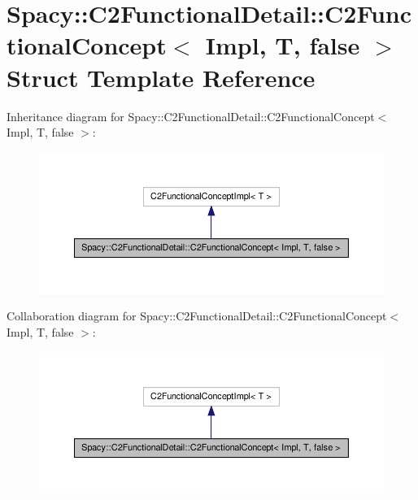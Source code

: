 \hypertarget{structSpacy_1_1C2FunctionalDetail_1_1C2FunctionalConcept_3_01Impl_00_01T_00_01false_01_4}{\section{\-Spacy\-:\-:\-C2\-Functional\-Detail\-:\-:\-C2\-Functional\-Concept$<$ \-Impl, \-T, false $>$ \-Struct \-Template \-Reference}
\label{structSpacy_1_1C2FunctionalDetail_1_1C2FunctionalConcept_3_01Impl_00_01T_00_01false_01_4}
}


\-Inheritance diagram for \-Spacy\-:\-:\-C2\-Functional\-Detail\-:\-:\-C2\-Functional\-Concept$<$ \-Impl, \-T, false $>$\-:
\nopagebreak
\begin{figure}[H]
\begin{center}
\leavevmode
\includegraphics[width=350pt]{structSpacy_1_1C2FunctionalDetail_1_1C2FunctionalConcept_3_01Impl_00_01T_00_01false_01_4__inherit__graph}
\end{center}
\end{figure}


\-Collaboration diagram for \-Spacy\-:\-:\-C2\-Functional\-Detail\-:\-:\-C2\-Functional\-Concept$<$ \-Impl, \-T, false $>$\-:
\nopagebreak
\begin{figure}[H]
\begin{center}
\leavevmode
\includegraphics[width=350pt]{structSpacy_1_1C2FunctionalDetail_1_1C2FunctionalConcept_3_01Impl_00_01T_00_01false_01_4__coll__graph}
\end{center}
\end{figure}
